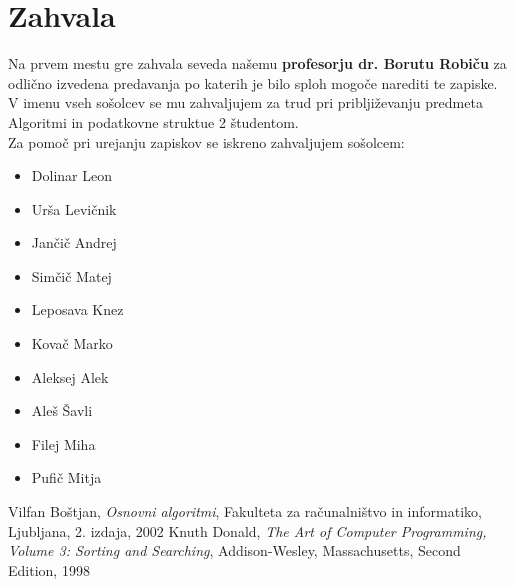 \documentclass[a4paper,10pt]{article}
\begin{document}
\section{Zahvala}
Na prvem mestu gre zahvala seveda na\v semu \textbf{profesorju dr. Borutu Robi\v cu} za odli\v cno izvedena predavanja po katerih je bilo sploh mogo\v ce narediti te zapiske. V imenu vseh so\v solcev se mu zahvaljujem za trud pri priblji\v zevanju predmeta Algoritmi in podatkovne struktue 2 \v studentom.\\
Za pomo\v c pri urejanju zapiskov se iskreno zahvaljujem so\v solcem:
\begin{itemize}
	\item Dolinar Leon
	\item Ur\v sa Levi\v cnik
	\item Jan\v ci\v c Andrej
	\item Sim\v ci\v c Matej
	\item Leposava Knez
	\item Kova\v c Marko
	\item Aleksej Alek
	\item Ale\v s \v Savli
	\item Filej Miha
	\item Pufi\v c Mitja
\end{itemize}

\begin{thebibliography}{2}
	Vilfan Bo\v stjan,
	\emph{Osnovni algoritmi}, 
	Fakulteta za ra\v cunalni\v stvo in informatiko, Ljubljana, 
	2. izdaja, 
	2002
	Knuth Donald,
	\emph{The Art of Computer Programming, Volume 3: Sorting and Searching}, 
	Addison-Wesley, Massachusetts, 
	Second Edition,
	1998
\end{thebibliography}
\end{document}
